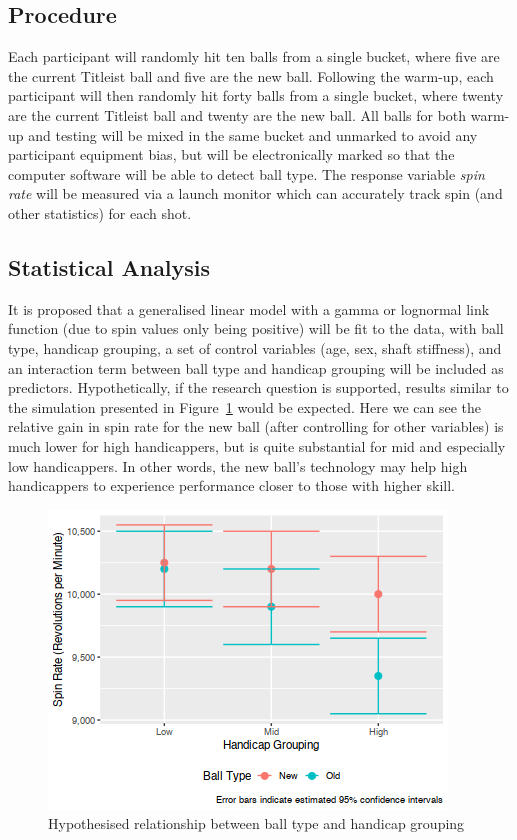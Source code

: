 \documentclass{article}
\begin{document}
\subsection*{Procedure}

Each participant will randomly hit ten balls from a single bucket, where five are the current Titleist ball and five are the new ball. 
Following the warm-up, each participant will then randomly hit forty balls from a single bucket, where twenty are the current Titleist ball and twenty are the new ball.
All balls for both warm-up and testing will be mixed in the same bucket and unmarked to avoid any participant equipment bias, but will be electronically marked so that the computer software will be able to detect ball type. 
The response variable \textit{spin rate} will be measured via a launch monitor which can accurately track spin (and other statistics) for each shot.

\subsection*{Statistical Analysis}

It is proposed that a generalised linear model with a gamma or lognormal link function (due to spin values only being positive) will be fit to the data, with ball type, handicap grouping, a set of control variables (age, sex, shaft stiffness), and an interaction term between ball type and handicap grouping will be included as predictors. 
Hypothetically, if the research question is supported, results similar to the simulation presented in Figure~\ref{fig:expectations} would be expected.
Here we can see the relative gain in spin rate for the new ball (after controlling for other variables) is much lower for high handicappers, but is quite substantial for mid and especially low handicappers. 
In other words, the new ball's technology may help high handicappers to experience performance closer to those with higher skill.

\begin{figure}[h]
    \centering
    \includegraphics[max width=\linewidth, scale=0.53]{expectations}
    \caption{\label{fig:expectations}Hypothesised relationship between ball type and handicap grouping}
\end{figure}
\end{document}
